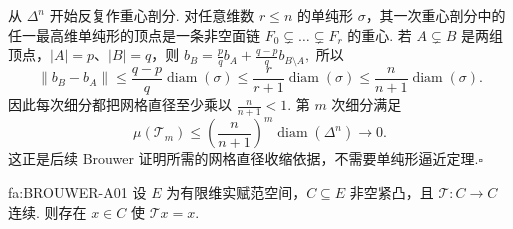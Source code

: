 \begin{FAProof}
从 \(\displaystyle \Delta^n\) 开始反复作重心剖分. 对任意维数 \(\displaystyle r\leqslant n\) 的单纯形 \(\displaystyle \sigma\)，其一次重心剖分中的任一最高维单纯形的顶点是一条非空面链 \(\displaystyle F_0\subsetneq\dots\subsetneq F_r\) 的重心. 若 \(\displaystyle A\subsetneq B\) 是两组顶点，\(\displaystyle |A|=p\)、\(\displaystyle |B|=q\)，则
\(\displaystyle b_B = \frac{p}{q}b_A + \frac{q-p}{q}b_{B\setminus A},\)
所以
\[
\|b_B-b_A\|
\leqslant
\frac{q-p}{q}\operatorname{diam}(\sigma)
\leqslant
\frac{r}{r+1}\operatorname{diam}(\sigma)
\leqslant
\frac{n}{n+1}\operatorname{diam}(\sigma).
\]
因此每次细分都把网格直径至少乘以 \(\displaystyle \frac{n}{n+1}<1\). 第 \(\displaystyle m\) 次细分满足
\[
\mu(\mathcal T_m)
\leqslant
\left(\frac{n}{n+1}\right)^m\operatorname{diam}(\Delta^n)
\longrightarrow0.
\]
这正是后续 Brouwer 证明所需的网格直径收缩依据，不需要单纯形逼近定理.\hfill\(\square\)

\end{FAProof}

\begin{FATheorem}{fa:BROUWER-A01}
设 \(\displaystyle E\) 为有限维实赋范空间，\(\displaystyle C\subseteq E\) 非空紧凸，且 \(\displaystyle \mathcal T:C\to C\) 连续. 则存在 \(\displaystyle x\in C\) 使 \(\displaystyle \mathcal T x=x\).
\end{FATheorem}

